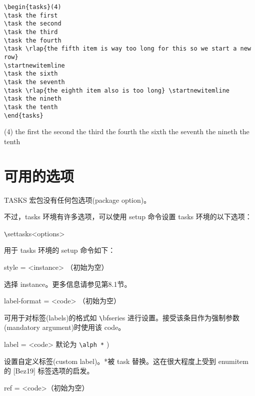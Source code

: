 \documentclass[a4paper,12pt,indent]{article}
\begin{document}
\begin{tcolorbox}[collower=black,colframe=Tasks,colback=white]
    \begin{lstlisting}
\begin{tasks}(4)
\task the first
\task the second
\task the third
\task the fourth
\task \rlap{the fifth item is way too long for this so we start a new row}
\startnewitemline
\task the sixth
\task the seventh
\task \rlap{the eighth item also is too long} \startnewitemline
\task the nineth
\task the tenth
\end{tasks}
\end{lstlisting}
        \tcblower
        \begin{tasks}(4)
            \task the first
            \task the second
            \task the third
            \task the fourth
            \task {}
            \startnewitemline
            \task the sixth
            \task the seventh
            \task {} \startnewitemline
            \task the nineth
            \task the tenth
            \end{tasks}
           \end{tcolorbox}

\section{可用的选项}
 \textcolor{Tasks}{TASKS} 宏包没有任何包选项(package option)。

不过，tasks 环境有许多选项，可以使用 setup 命令设置 tasks 环境的以下选项：

\verb|\|\textcolor{Tasks}{settasks{<options>}}

用于 tasks 环境的 setup 命令如下：

style = {<instance>} \hfill （初始为空）

选择 instance。更多信息请参见第8.1节。

label-format = {<code>} \hfill （初始为空）

可用于对标签(labels)的格式如 \verb|\|\textcolor{Tasks}{bfseries} 进行设置。接受该条目作为强制参数(mandatory argument)时使用该 code。


label = {<code>} \hfill \hfill 默论为 \verb|\alph *| )

设置自定义标签(custom label)。*被 {task} 替换。这在很大程度上受到 enumitem 的 [Bez19] 标签选项的启发。


ref = {<code>}\hfill （初始为空）
\end{document}
